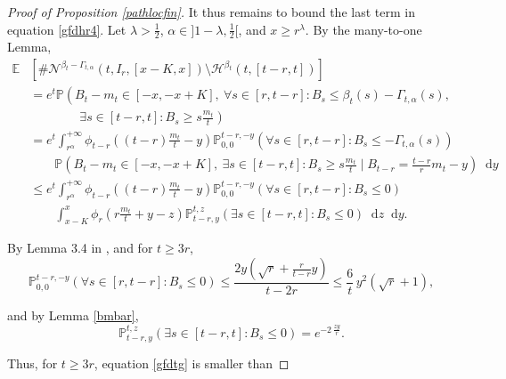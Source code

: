 \documentclass{article}
\newcommand{\nB}[2]{\mathcal{N}^{#1}(#2)}
\newcommand{\E}[0]{\mathbb{E}}
\newcommand{\Prob}{\mathbb{P}}
\begin{document}
\begin{proof}[Proof of Proposition \ref{pathlocfin}]
It thus remains to bound the last term in equation \eqref{gfdhr4}.
Let $\lambda>\frac{1}{2}$, $\alpha \in ]1-\lambda, \frac{1}{2}[$, and $x\geq r^\lambda$. By the many-to-one Lemma, 
\begin{equation}\label{gfdtg}
    \begin{split}
         \E&\left[  \#  \nB{\beta_t-\Gamma_{t,\alpha}}{t,I_r,[x-K,x]} \setminus \mathcal{H}^{\beta_t}(t, [t-r,t])   \right]\\
         & =  e^t \Prob\left( B_t -m_t \in [-x,-x+K],\ \forall s\in [r,t-r]: B_s \leq \beta_t(s)-\Gamma_{t,\alpha}(s), \right. \\
         & \qquad\qquad\left. \exists s \in [t-r,t] : B_s\geq s\frac{m_t}{t} \right)
         \\& = e^t  \int_{r^\alpha}^{+\infty} \phi_{t-r}\left((t-r)\frac{m_t}{t} -y\right)\Prob_{0,0}^{t-r,-y}\left(\forall s\in [r,t-r]: B_s \leq -\Gamma_{t,\alpha}(s)\right) 
         \\& \qquad \Prob\left( B_t -m_t \in [-x,-x+K],\ \exists s \in [t-r,t] : B_s\geq s\frac{m_t}{t} \mid B_{t-r}=\tfrac{t-r}{r}m_t -y \right)\mathop{}\!\mathrm{d}y
         \\& \leq e^t  \int_{r^\alpha}^{+\infty} \phi_{t-r}\left((t-r)\frac{m_t}{t} -y\right)\Prob_{0,0}^{t-r,-y}\left(\forall s\in [r,t-r]: B_s \leq 0\right) 
         \\& \qquad \int_{x-K}^x \phi_{r}\left(r\frac{m_t}{t} +y-z\right)\Prob_{t-r,y}^{t,z}\left( \exists s \in [t-r,t] : B_s\leq 0 \right)\mathop{}\!\mathrm{d}z \mathop{}\!\mathrm{d}y.
    \end{split}
\end{equation}


By Lemma 3.4 in \cite{arguin2011extremal}, and for $t\geq 3r$,
\begin{equation}
    \Prob_{0,0}^{t-r,-y} \left( \forall s \in [r, t - r] : B_s \leq 0 \right) \leq  \frac{2y \left( \sqrt{r} + \frac{r}{t - r} y \right)}{t - 2r} \leq \frac{6}{t} \, y^2 \left( \sqrt{r} + 1 \right),
\end{equation}

and by Lemma \ref{bmbar},
\begin{equation}
    \Prob_{t-r,y}^{t,z} \left( \exists s \in [t - r, t] : B_s \leq 0 \right) = e^{-2 \,\frac{zy}{r}}.
\end{equation}

Thus, for $t\geq 3r$, equation \eqref{gfdtg} is smaller than


\end{proof}
\end{document}
